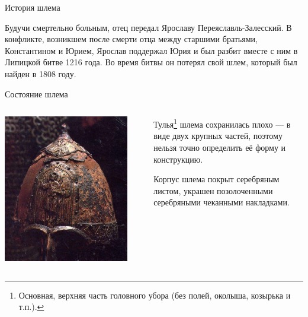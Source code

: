 \begin{frame}{История шлема}

	Будучи смертельно больным, отец передал Ярославу Переяславль-Залесский. В конфликте, возникшем после смерти отца между старшими братьями, Константином и Юрием, Ярослав поддержал Юрия и был разбит вместе с ним в Липицкой битве 1216 года. Во время битвы он потерял свой шлем, который был найден в 1808 году.

\end{frame}
\begin{frame}{Состояние шлема}
	\begin{columns}
		\begin{column}{0.45\textwidth}
			\includegraphics[width=0.9\textwidth]{shlem.jpg}
		\end{column}
		\begin{column}{0.45\textwidth}

			Тулья\footnote{Основная, верхняя часть головного убора (без полей, околыша, козырька и т.п.).} шлема сохранилась плохо — в виде двух крупных частей, поэтому нельзя точно определить её форму и конструкцию.

			Корпус шлема покрыт серебряным листом, украшен позолоченными серебряными чеканными накладками.

		\end{column}
	\end{columns}
\end{frame}
